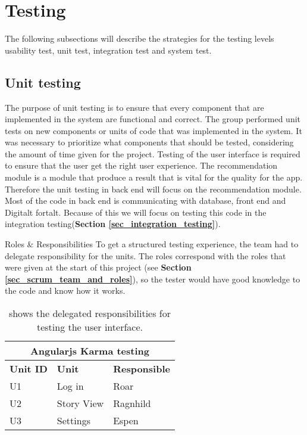 \chapter{Testing}
\label{chap_testing}

The following subsections will describe the strategies for the testing levels usability test, unit test, integration test and system test. 

\section{Unit testing}
\label{sec_unit_testing}

The purpose of unit testing is to ensure that every component that are implemented in the system are functional and correct. The group performed unit tests on new components or units of code that was implemented in the system. It was necessary to prioritize what components that should be tested, considering the amount of time given for the project. Testing of the user interface is required to ensure that the user get the right user experience. The recommendation module is a module that produce a result that is vital for the quality for the app. Therefore the unit testing in back end will focus on the recommendation module. Most of the code in back end is communicating with database, front end and Digitalt fortalt. Because of this we will focus on testing this code in the integration testing(\textbf{Section \ref{sec_integration_testing}}).\newline

Roles \& Responsibilities\newline
To get a structured testing experience, the team had to delegate responsibility for the units. The roles correspond with the roles that were given at the start of this project (see \textbf{Section \ref{sec_scrum_team_and_roles}}), so the tester would have good knowledge to the code and know how it works.  

\begin{table}[!h]
	\begin{center}
		\begin{tabular}{ | l | l | l |}
			\hline
			\multicolumn{3}{|c|}{\textbf{Angularjs Karma testing}} \\
			\hline
			\textbf{Unit ID} & \textbf{Unit} & \textbf{Responsible} \\ \hline
			U1 & Log in & Roar \\ \hline
			U2 & Story View & Ragnhild \\ \hline
			U3 & Settings & Espen \\ \hline
		\end{tabular}
	\end{center}
	\caption{shows the delegated responsibilities for testing the user interface.}
	\label{Tab_karmatesting}
\end{table}

